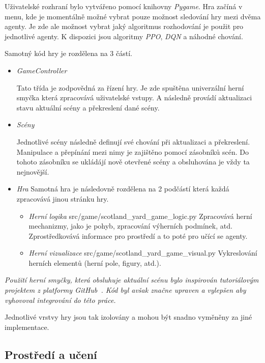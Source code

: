Uživatelské rozhraní bylo vytvářeno pomocí knihovny \emph{Pygame}.
Hra začíná v menu, kde je momentálně možné vybrat pouze možnost sledování hry mezi dvěma agenty.
Je zde ale možnost vybrat jaký algoritmus rozhodování je použit pro jednotlivé agenty.
K dispozici jsou algoritmy \emph{PPO}, \emph{DQN} a náhodné chování.

Samotný kód hry je rozdělena na 3 částí.

\begin{itemize}
  \item \emph{GameController}~\cite{GameSceneController}
  
  Tato třída je zodpovědná za řízení hry.
  Je zde spuštěna univerzální herní smyčka která zpracovává uživatelské vstupy.
  A následně provádí aktualizaci stavu aktuální scény a překreslení dané scény.
  \item \emph{Scény}~\cite{GameSceneController}
  
  Jednotlivé scény následně definují své chování při aktualizaci a překreslení.
  Manipulace a přepínání mezi nimy je zajištěno pomocí zásobníků scén.
  Do tohoto zásobníku se ukládájí nově otevřené scény a obsluhována je vždy ta nejnovější.

  \item \emph{Hra}
    Samotná hra je následovně rozdělena na 2 podčástí která každá zpracovává jinou stránku hry.
    \begin{itemize}
      \item \emph{Herní logika} src/game/scotland\_yard\_game\_logic.py
      Zpracovává herní mechanizmy, jako je pohyb, zpracování výherních podmínek, atd.
      Zprostředkovává informace pro prostředí a to poté pro učící se agenty.

      \item \emph{Herní vizualizace}  src/game/scotland\_yard\_game\_visual.py
      Vykreslování herních elementů (herní pole, figury, atd.).
    \end{itemize}
\end{itemize}

\textit{Použití herní smyčky, která obsluhuje aktuální scénu bylo inspirován tutoriálovým projektem z platformy GitHub~\cite{GameSceneController}.
Kód byl avšak značne upraven a vylepšen aby vyhovoval integrování do této práce.}

Jednotlivé vrstvy hry jsou tak izolovány a mohou být snadno vyměněny za jiné implementace.

\subsection{Prostředí a učení}\label{subsec:prostredi}

